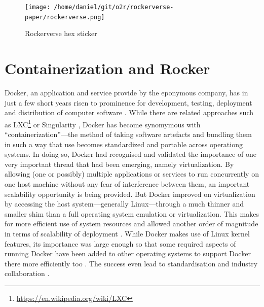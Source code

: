\begin{figure}
\centering
\texttt{[image: /home/daniel/git/o2r/rockerverse-paper/rockerverse.png]}
\caption{Rockerverse hex sticker}
\end{figure}

\hypertarget{containerization-and-rocker}{%
\section{Containerization and
Rocker}\label{containerization-and-rocker}}

Docker, an application and service provide by the eponymous company, has
in just a few short years risen to prominence for development, testing,
deployment and distribution of computer software
\citep[cf.][]{datadog_8_2018,munoz_history_2019}. While there are
related approaches such as
LXC\footnote{\href{https://en.wikipedia.org/wiki/LXC}{https://en.wikipedia.org/wiki/LXC}}
or Singularity \citep{kurtzer_singularity_2017}, Docker has become
synomymous with ``containerization''---the method of taking software
artefacts and bundling them in such a way that use becomes standardized
and portable across operationg systems. In doing so, Docker had
recognised and validated the importance of one very important thread
that had been emerging, namely virtualization. By allowing (one or
possibly) multiple applications or services to run concurrently on one
host machine without any fear of interference between them, an important
scalability opportunity is being provided. But Docker improved on
virtualization by accessing the host system---generally Linux---through
a much thinner and smaller shim than a full operating system emulation
or virtualization. This makes for more efficient use of system resources
\citep{felter_updated_2015} and allowed another order of magnitude in
terms of scalability of deployment \citep[cf.][]{datadog_8_2018}. While
Docker makes use of Linux kernel features, its importance was large
enough so that some required aspects of running Docker have been added
to other operating systems to support Docker there more efficiently too
\citep{microsoft_linux_2019}. The success even lead to standardisation
and industry collaboration \citep{oci_open_2019}.

